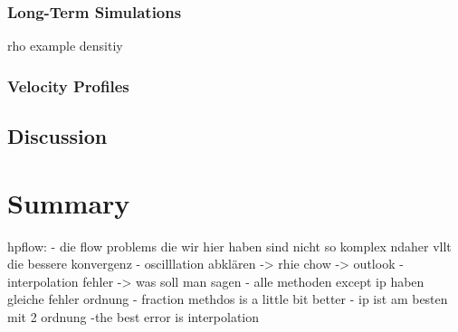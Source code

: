 \subsubsection{Long-Term Simulations}
rho example densitiy

\subsubsection{Velocity Profiles}

\subsection{Discussion}


\section{Summary}
hpflow:
- die flow problems die wir hier haben sind nicht so komplex ndaher
vllt die bessere konvergenz
- oscilllation abklären -> rhie chow -> outlook
- interpolation fehler -> was soll man sagen
- alle methoden except ip haben gleiche fehler ordnung
- fraction methdos is a little bit better
- ip ist am besten mit 2 ordnung
-the best error is interpolation



